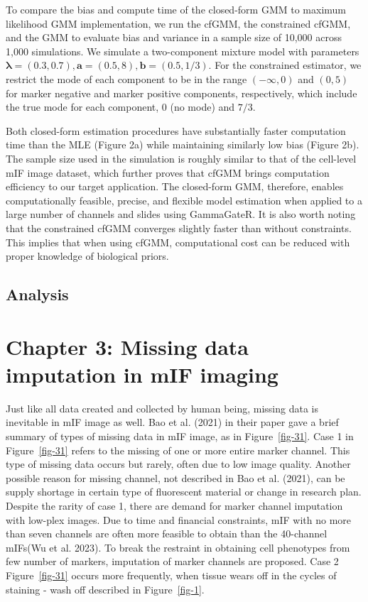 \documentclass[
  letterpaper,
  DIV=11,
  numbers=noendperiod,
  oneside]{scrreprt}
\begin{document}
To compare the bias and compute time of the closed-form GMM to maximum
likelihood GMM implementation, we run the cfGMM, the constrained cfGMM,
and the GMM to evaluate bias and variance in a sample size of 10,000
across 1,000 simulations. We simulate a two-component mixture model with
parameters
\(\pmb{\lambda} = (0.3, 0.7), \pmb{a} = (0.5, 8), \pmb{b} = (0.5, 1/3)\).
For the constrained estimator, we restrict the mode of each component to
be in the range \((-\infty, 0)\) and \((0,5)\) for marker negative and
marker positive components, respectively, which include the true mode
for each component, \(0\) (no mode) and \(7/3\).

Both closed-form estimation procedures have substantially faster
computation time than the MLE (Figure 2a) while maintaining similarly
low bias (Figure 2b). The sample size used in the simulation is roughly
similar to that of the cell-level mIF image dataset, which further
proves that cfGMM brings computation efficiency to our target
application. The closed-form GMM, therefore, enables computationally
feasible, precise, and flexible model estimation when applied to a large
number of channels and slides using GammaGateR. It is also worth noting
that the constrained cfGMM converges slightly faster than without
constraints. This implies that when using cfGMM, computational cost can
be reduced with proper knowledge of biological priors.

\hypertarget{analysis}{%
\section{Analysis}\label{analysis}}


\hypertarget{sec-imputation}{%
\chapter{Chapter 3: Missing data imputation in mIF
imaging}\label{sec-imputation}}

Just like all data created and collected by human being, missing data is
inevitable in mIF image as well. Bao et al. (2021) in their paper gave a
brief summary of types of missing data in mIF image, as in
Figure~\ref{fig-31}. Case 1 in Figure~\ref{fig-31} refers to the missing
of one or more entire marker channel. This type of missing data occurs
but rarely, often due to low image quality. Another possible reason for
missing channel, not described in Bao et al. (2021), can be supply
shortage in certain type of fluorescent material or change in research
plan. Despite the rarity of case 1, there are demand for marker channel
imputation with low-plex images. Due to time and financial constraints,
mIF with no more than seven channels are often more feasible to obtain
than the 40-channel mIFs(Wu et al. 2023). To break the restraint in
obtaining cell phenotypes from few number of markers, imputation of
marker channels are proposed. Case 2 Figure~\ref{fig-31} occurs more
frequently, when tissue wears off in the cycles of staining - wash off
described in Figure~\ref{fig-1}.
\end{document}
